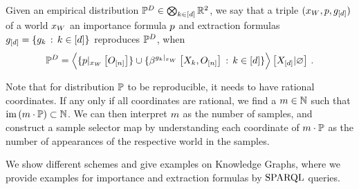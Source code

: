 \begin{definition}
    Given an empirical distribution $\mathbb{P}^{D}\in\bigotimes_{k\in[d]}\mathbb{R}^2$, we say that a triple $(x_{W},p,g_{[d]})$ of a \firstOrderLogic{} world $x_{W}$ an importance formula $p$ and extraction formulas $g_{[d]}=\{g_{k}\,:\,k\in[d]\}$ reproduces $\mathbb{P}^{D}$, when
    \begin{align*}
        \mathbb{P}^{D}
        = \left\langle \{{p}|_{x_{W}} \left[O_{[n]}\right]\}\cup
        \{\beta^{{g_{k}}|_{x_{W}}}\left[X_{k},O_{[n]}\right] \,:\, k\in[d]\}
        \right\rangle \left[ X_{[d]} | \varnothing \right] \, .
    \end{align*}
\end{definition}

Note that for distribution $\mathbb{P}$ to be reproducible, it needs to have rational coordinates. %
If any only if all coordinates are rational, we find a $m\in\mathbb{N}$ such that $\mathrm{im}\left(m\cdot\mathbb{P}\right)\subset\mathbb{N}$.
We can then interpret $m$ as the number of samples, and construct a sample selector map by understanding each coordinate of $m\cdot\mathbb{P}$ as the number of appearances of the respective world in the samples.

We show different schemes and give examples on Knowledge Graphs, where we provide examples for importance and extraction formulas by $\mathrm{SPARQL}$ queries.


%



